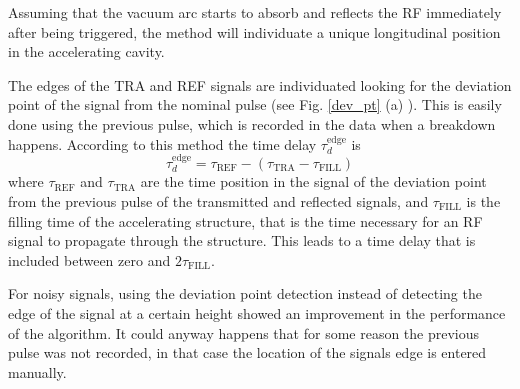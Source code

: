 Assuming that the vacuum arc starts to absorb and reflects the RF immediately after being triggered, the method will individuate a unique longitudinal position in the accelerating cavity.

The edges of the TRA and REF signals are individuated looking for the deviation point of the signal from the nominal pulse (see Fig. \ref{dev_pt} (a) ). This is easily done using the previous pulse, which is recorded in the data when a breakdown happens.  According to this method the time delay $\tau_d^{\text{edge}}$ is
\begin{equation}
\tau_d^{\text{edge}} = \tau_{\text{REF}} - (\tau_{\text{TRA}} - \tau_{\text{FILL}})
\end{equation}
where $\tau_{\text{REF}} $ and $\tau_{\text{TRA}}$ are the time position in the signal of the deviation point from the previous pulse of the transmitted and reflected signals, and $\tau_{\text{FILL}}$ is the filling time of the accelerating structure, that is the time necessary for an RF signal to propagate through the structure. This leads to a time delay that is included between zero and $2 \tau_{\text{FILL}}$.

For noisy signals, using the deviation point detection instead of detecting the edge of the signal at a certain height showed an improvement in the performance of the algorithm. It could anyway happens that for some reason the previous pulse was not recorded, in that case the location of the signals edge is entered manually.


